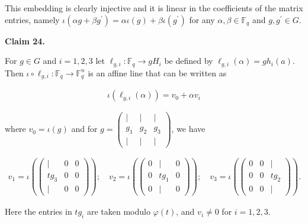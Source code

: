 \documentclass[10pt,a4paper]{article}
\begin{document}
This embedding is clearly injective and it is linear in the coefficients of the matrix entries, namely $\iota(\alpha g+\beta g^{\prime})=\alpha\iota(g)+\beta\iota(g^{\prime})$ for any $\alpha,\beta\in\mathbb{F}_{q}$ and $g,g^{\prime}\in G$.\par





\par\medskip\noindent\textbf{
Claim 24. 
}\par



For $g\in G$ and $i=1,2,3$ let $\ell_{g,i}:\mathbb{F}_{q}\to gH_{i}$ be defined by $\ell_{g,i}(\alpha)=gh_{i}(a)$. Then $\iota\circ\ell_{g,i}:\mathbb{F}_{q}\to\mathbb{F}_{q}^{n}$ is an affine line that can be written as\par


\[\begin{gathered}
\iota(\ell_{g,i}(\alpha))=v_{0}+\alpha v_{i}
\end{gathered}\]


where $v_{0}=\iota(g)$ and for $g=\begin{pmatrix}|&|&|\\
g_{1}&g_{2}&g_{3}\\
|&|&|\end{pmatrix}$, we have\par


\[\begin{gathered}
v_{1}=\iota\left(\begin{pmatrix}|&0&0\\
tg_{3}&0&0\\
|&0&0\end{pmatrix}\right);\quad v_{2}=\iota\left(\begin{pmatrix}0&|&0\\
0&tg_{1}&0\\
0&|&0\end{pmatrix}\right);\quad v_{3}=\iota\left(\begin{pmatrix}0&0&|\\
0&0&tg_{2}\\
0&0&|\end{pmatrix}\right).
\end{gathered}\]


Here the entries in $tg_{i}$ are taken modulo $\varphi(t)$, and $v_{i}\neq 0$ for $i=1,2,3$.\par
\end{document}
